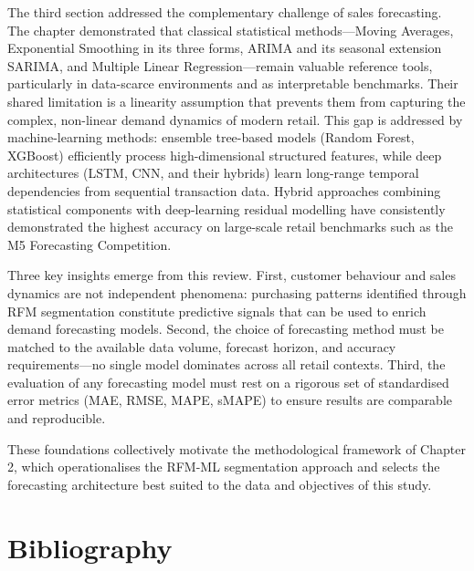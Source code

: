 The third section addressed the complementary challenge of sales forecasting.
The chapter demonstrated that classical statistical methods—Moving Averages,
Exponential Smoothing in its three forms, ARIMA and its seasonal extension
SARIMA, and Multiple Linear Regression—remain valuable reference tools,
particularly in data-scarce environments and as interpretable benchmarks.
Their shared limitation is a linearity assumption that prevents them from
capturing the complex, non-linear demand dynamics of modern retail. This gap
is addressed by machine-learning methods: ensemble tree-based models (Random
Forest, XGBoost) efficiently process high-dimensional structured features,
while deep architectures (LSTM, CNN, and their hybrids) learn long-range
temporal dependencies from sequential transaction data. Hybrid approaches
combining statistical components with deep-learning residual modelling have
consistently demonstrated the highest accuracy on large-scale retail
benchmarks such as the M5 Forecasting Competition.

Three key insights emerge from this review. First, customer behaviour and
sales dynamics are not independent phenomena: purchasing patterns identified
through RFM segmentation constitute predictive signals that can be used to
enrich demand forecasting models. Second, the choice of forecasting method
must be matched to the available data volume, forecast horizon, and accuracy
requirements—no single model dominates across all retail contexts. Third,
the evaluation of any forecasting model must rest on a rigorous set of
standardised error metrics (MAE, RMSE, MAPE, sMAPE) to ensure results are
comparable and reproducible.

These foundations collectively motivate the methodological framework of
Chapter 2, which operationalises the RFM-ML segmentation approach and
selects the forecasting architecture best suited to the data and objectives
of this study.



\clearpage
\section*{Bibliography}

